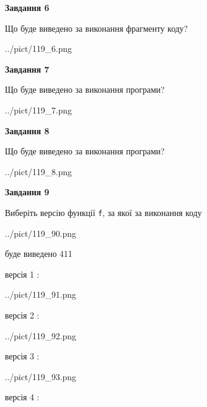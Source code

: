 \documentclass[12pt, ukrainian]{article}
\def\code#1{\Verb!#1!}
\begin{document}
{\begin {large}
{\begin {center}\textbf{Завдання 6}\end {center}}

Що буде виведено за виконання фрагменту коду?\par
\begin{center}
	{../pict/119_6.png}
\end{center}
\newpage

{\begin {center}\textbf{Завдання 7}\end {center}}

Що буде виведено за виконання програми?\par
\begin{center}
	{../pict/119_7.png}
\end{center}
\newpage

{\begin {center}\textbf{Завдання 8}\end {center}}

Що буде виведено за виконання програми?\par
\begin{center}
	{../pict/119_8.png}
\end{center}
\newpage

{\begin {center}\textbf{Завдання 9}\end {center}}

Виберіть версію функції \code{f}, за якої за виконання коду
\begin{center}
	{../pict/119_90.png}
\end{center}
буде виведено 411

\vspace{5mm}
версія 1 :

\begin{center}
	{../pict/119_91.png}
\end{center}
версія 2 :

\begin{center}
	{../pict/119_92.png}
\end{center}
версія 3 :

\begin{center}
	{../pict/119_93.png}
\end{center}
версія 4 :


\end{large}}
\end{document}
